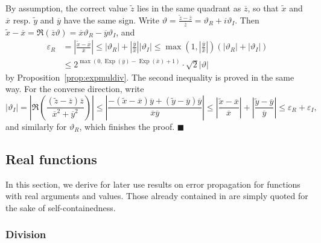 \documentclass {article}
\newcommand {\corr}[1]{\widetilde {#1}}
\newcommand {\appro}[1]{\overline {#1}}
\DeclareMathOperator{\Exp}{\operatorname {Exp}}
\renewcommand {\epsilon}{\varepsilon}
\renewcommand {\theta}{\vartheta}
\renewcommand {\leq}{\leqslant}
\newenvironment{proof}{\noindent{\bf Proof:}}{{\hspace* {\fill}$\blacksquare$}}
\begin{document}
\begin {proof}
By assumption, the correct value $\corr z$ lies in the same quadrant as
$\appro z$, so that $\corr x$ and $\appro x$ resp. $\corr y$ and $\appro y$
have the same sign. Write $\theta = \frac {\corr z - \appro z}{\appro z}
= \theta_R + i \theta_I$. Then
$\corr x - \appro x = \Re (\appro z \theta)
= \appro x \theta_R - \appro y \theta_I$, and
\begin {align*}
\epsilon_R
&= \left| \frac {\corr x - \appro x}{\appro x} \right|
\leq |\theta_R| + \left| \frac {\appro y}{\appro x} \right| |\theta_I|
\leq \max \left( 1, \left| \frac {\appro y}{\appro x} \right| \right)
(|\theta_R| + |\theta_I|) \\
&\leq 2^{\max \left( 0, \Exp (\appro y) - \Exp (\appro x) + 1 \right)}
\cdot \sqrt 2 |\theta|
\end {align*}
by Proposition~\ref {prop:expmuldiv}. The second inequality is proved
in the same way. For the converse direction, write
\[
|\theta_I|
= \left| \Re \left(
\frac {(\corr z - \appro z) \overline z}{\appro x^2 + \appro y^2}
\right) \right|
\leq \left|
\frac {- (\corr x - \appro x) \appro y + (\corr y - \appro y) \appro y}
      {\appro x \appro y} \right|
\leq
  \left| \frac {\corr x - \appro x}{\appro x} \right|
+ \left| \frac {\corr y - \appro y}{\appro y} \right|
\leq \epsilon_R + \epsilon_I,
\]
and similarly for $\theta_R$, which finishes the proof.
\end {proof}



\subsection {Real functions}

In this section, we derive for later use results on error propagation for
functions with real arguments and values. Those already contained in
\cite{MPFRAlgorithms} are simply quoted for the sake of self-containedness.



\subsubsection {Division}
\label {sssec:proprealdiv}
\end{document}

